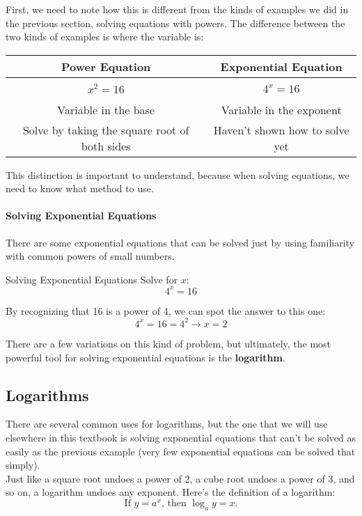 First, we need to note how this is different from the kinds of examples we did in the previous section, solving equations with powers.  The difference between the two kinds of examples is where the variable is:
\begin{center}
\begin{tabular}{c c}
\textbf{Power Equation} & \textbf{Exponential Equation}\\
\hline
\\
$x^2 = 16$ & $4^x = 16$\\ \\
Variable in the base & Variable in the exponent\\
Solve by taking the square root of both sides & Haven't shown how to solve yet
\end{tabular}
\end{center}

This distinction is important to understand, because when solving equations, we need to know what method to use.

\paragraph{Solving Exponential Equations} There are some exponential equations that can be solved just by using familiarity with common powers of small numbers.

\begin{example}{Solving Exponential Equations}
Solve for $x$: \[4^x = 16\]

\sol
By recognizing that 16 is a power of 4, we can spot the answer to this one:
\[4^x = 16 = 4^2 \longrightarrow \boxed{x = 2}\]
\end{example}

There are a few variations on this kind of problem, but ultimately, the most powerful tool for solving exponential equations is the \textbf{logarithm}.
\pagebreak

\subsection{Logarithms}

There are several common uses for logarithms, but the one that we will use elsewhere in this textbook is solving exponential equations that can't be solved as easily as the previous example (very few exponential equations can be solved that simply).\\

Just like a square root undoes a power of 2, a cube root undoes a power of 3, and so on, a logarithm undoes any exponent.  Here's the definition of a logarithm:
\[\textrm{If } y = a^x \textrm{, then } \log_a y = x.\]

